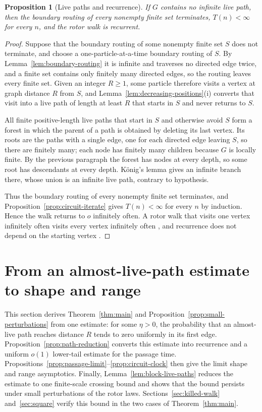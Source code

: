 \documentclass[11pt]{amsart}
\theoremstyle{plain}
\newtheorem{proposition}[theorem]{Proposition}
\theoremstyle{definition}
\begin{document}
	\begin{proposition}[Live paths and recurrence]\label{prop:live-recurrence}
		If $G$ contains no infinite live path, then the boundary routing of every
		nonempty finite set terminates, $T(n)<\infty$ for every $n$, and the rotor
		walk is recurrent.
	\end{proposition}
	
	\begin{proof}
		Suppose that the boundary routing of some nonempty finite set $S$ does not
		terminate, and choose a one-particle-at-a-time boundary routing of $S$.  By
		Lemma~\ref{lem:boundary-routing} it is infinite and traverses no directed edge
		twice, and a finite set contains only finitely many directed edges, so the
		routing leaves every finite set.  Given an integer $R\geq1$, some particle
		therefore visits a vertex at graph distance $R$ from $S$, and
		Lemma~\ref{lem:decreasing-positions}\textup{(i)} converts that visit into a
		live path of length at least $R$ that starts in $S$ and never returns to $S$.
		
		All finite positive-length live paths that start in $S$ and otherwise avoid $S$
		form a forest
		in which the parent of a path is obtained by deleting its last vertex.  Its
		roots are the paths with a single edge, one for
		each directed edge leaving $S$, so there are finitely many; each node has
		finitely many children because $G$ is locally finite.  By the
		previous paragraph the forest has nodes at every depth, so some root has
		descendants at every depth.  K\"onig's lemma gives an infinite branch there,
		whose union is an infinite live path, contrary to hypothesis.
		
		Thus the boundary routing of every nonempty finite set terminates, and
		Proposition~\ref{prop:circuit-iterate} gives $T(n)<\infty$ for every $n$ by
		induction.  Hence the walk returns to $o$ infinitely often.  A rotor walk that
		visits one vertex infinitely often visits every vertex infinitely often
		\citep[Lemma~6]{HolroydPropp2010}, and recurrence does not depend on the
		starting vertex \citep[Theorem~1]{AngelHolroyd2012}.
	\end{proof}
	
	
	\section{From an almost-live-path estimate to shape and range}
	\label{sec:recurrence}
	
	This section derives Theorem~\ref{thm:main} and
	Proposition~\ref{prop:small-perturbations} from one estimate: for some
	$\eta>0$, the probability that an almost-live path reaches distance $R$ tends
	to zero uniformly in its first edge.  Proposition~\ref{prop:path-reduction}
	converts this estimate into recurrence and a uniform $o(1)$ lower-tail
	estimate for the passage time.
	Propositions~\ref{prop:passage-limit}--\ref{prop:circuit-clock} then give the
	limit shape and range asymptotics.  Finally,
	Lemma~\ref{lem:block-live-paths} reduces the estimate to one finite-scale
	crossing bound and shows that the bound persists under small perturbations of
	the rotor laws.  Sections~\ref{sec:killed-walk} and~\ref{sec:square} verify
	this bound in the two cases of Theorem~\ref{thm:main}.
	
\end{document}
